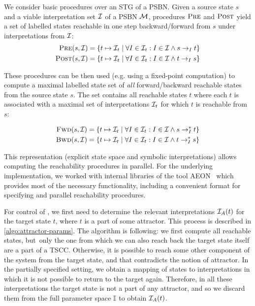We consider basic procedures over an STG of a PSBN. Given a source state $s$ and a viable interpretation set $\mathcal{I}$ of a PSBN $\mathcal{M}$, procedures $\textsc{Pre}$ and $\textsc{Post}$ yield a set of labelled states reachable in one step backward/forward from $s$ under interpretations from $\mathcal{I}$: 
\begin{align*}
\textsc{Pre}(s, \mathcal{I}) = \{ t \mapsto \mathcal{I}_t \mid \forall I \in \mathcal{I}_t : I \in \mathcal{I} \land s \to_{I} t \}\\
\textsc{Post}(s, \mathcal{I}) =\{ t \mapsto \mathcal{I}_t \mid \forall I \in \mathcal{I}_t : I \in \mathcal{I} \land t \to_{I} s \}
\end{align*}

These procedures can be then used (e.g. using a fixed-point computation) to compute a maximal labelled state set of \emph{all} forward/backward reachable states from the source state $s$. The set contains all reachable states $t$ where each $t$ is associated with a maximal set of interpretations $\mathcal{I}_t$ for which $t$ is reachable from $s$:

\begin{align*}
\textsc{Fwd}(s, \mathcal{I}) = \{ t \mapsto \mathcal{I}_t \mid \forall I \in \mathcal{I}_t : I \in \mathcal{I} \land s \to^*_{I} t \}\\
\textsc{Bwd}(s, \mathcal{I}) =\{ t \mapsto \mathcal{I}_t \mid \forall I \in \mathcal{I}_t : I \in \mathcal{I} \land t \to^*_{I} s \}
\end{align*}

This representation (explicit state space and symbolic interpretations) allows computing the reachability procedures in parallel. For the underlying implementation, we worked with internal libraries of the tool AEON~\cite{aeon} which provides most of the necessary functionality, including a convenient format for specifying  and parallel reachability procedures.

For control of \PBN{}, we first need to determine the relevant interpretations $\mathcal{I}_A(t)$ for the target state $t$, where $t$ is a part of some attractor. This process is described in \autoref{algo:attractor-params}. The algorithm is following: we first compute all reachable states, but~only the one from which we can also reach back the target state itself are a part of a TSCC. Otherwise, it is possible to reach some other component of the system from the target state, and that contradicts the notion of attractor. In the partially specified setting, we obtain a mapping of states to interpretations in which it is not possible to return to the target again. Therefore, in all these interpretations the target state is not a part of any attractor, and so we discard them from the full parameter space $\mathbb{I}$ to obtain $\mathcal{I}_A(t)$. 

